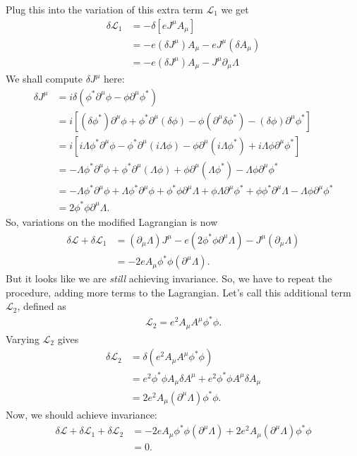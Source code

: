 \documentclass{book}
\numberwithin{equation}{section}
\theoremstyle{definition}
\newcommand{\p}{\partial}
\newcommand{\lag}{\mathcal{L}}
\begin{document}
Plug this into the variation of this extra term $\lag_1$ we get
\begin{align}
\delta \lag_1&=-\delta[eJ^\mu A_\mu]\\
&= -e(\delta J^\mu)A_\mu -eJ^\mu(\delta A_\mu)\\
&= -e(\delta J^\mu)A_\mu - J^\mu\p_\mu\Lambda
\end{align}
We shall compute $\delta J^\mu$ here:
\begin{align}
\delta J^\mu &= i\delta  (\phi^*\p^\mu\phi - \phi\p^\mu\phi^*)\\
&= i[(\delta\phi^*)\p^\mu\phi + \phi^*\p^\mu(\delta\phi)- \phi(\p^\mu\delta\phi^*) - (\delta\phi)\p^\mu\phi^*]\\
&= i[i\Lambda\phi^*\p^\mu\phi - \phi^*\p^\mu (i\Lambda \phi)- \phi\p^\mu (i\Lambda\phi^*) + i\Lambda\phi\p^\mu\phi^*]\\
&= -\Lambda\phi^*\p^\mu\phi + \phi^*\p^\mu (\Lambda \phi) + \phi\p^\mu (\Lambda\phi^*) - \Lambda\phi\p^\mu\phi^*\\
&= -\Lambda\phi^*\p^\mu\phi + \Lambda\phi^*\p^\mu\phi + \phi^*\phi\p^\mu\Lambda + \phi \Lambda \p^\mu\phi^* + \phi \phi^*\p^\mu\Lambda - \Lambda\phi\p^\mu\phi^*\\
&= 2\phi^*\phi \p^\mu\Lambda.
\end{align}
So, variations on the modified Lagrangian is now
\begin{align}
\delta \lag + \delta \lag_1 &= (\p_\mu\Lambda)J^\mu -e(2\phi^*\phi\p^\mu\Lambda) - J^\mu(\p_\mu\Lambda)\\
&=  -2eA_\mu\phi^*\phi(\p^\mu\Lambda).
\end{align}
But it looks like we are \textit{still} achieving invariance. So, we have to repeat the procedure, adding more terms to the Lagrangian. Let's call this additional term $\lag_2$, defined as
\begin{align}
\lag_2 = e^2 A_\mu A^\mu\phi^*\phi.
\end{align}
Varying $\lag_2$ gives
\begin{align}
\delta \lag_2 &= \delta(e^2 A_\mu A^\mu\phi^*\phi)\\
&= e^2 \phi^*\phi A_\mu\delta A^\mu + e^2 \phi^*\phi A^\mu\delta A_\mu\\
&= 2e^2A_\mu(\p^\mu \Lambda)\phi^*\phi.
\end{align}
Now, we should achieve invariance:
\begin{align}
\delta \lag + \delta \lag_1 + \delta \lag_2 &= -2eA_\mu\phi^*\phi(\p^\mu\Lambda) + 2e^2A_\mu(\p^\mu \Lambda)\phi^*\phi\\
&= 0.
\end{align}
\end{document}
